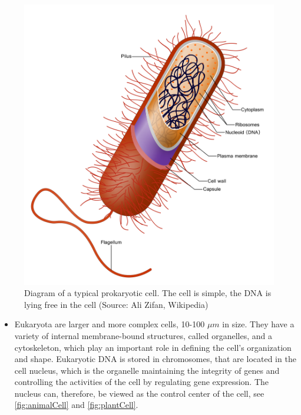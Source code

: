 \documentclass[
  11pt,
]{book}
\providecommand{\tightlist}{%
  \setlength{\itemsep}{0pt}\setlength{\parskip}{0pt}}
\begin{document}
\begin{figure}

{\centering \includegraphics[width=0.5\linewidth]{./figs/prokaryoteCell} 

}

\caption{Diagram of a typical prokaryotic cell. The cell is simple, the DNA is lying free in the cell (Source: Ali Zifan, Wikipedia)}\label{fig:prokaryotaCell}
\end{figure}

\begin{itemize}
\tightlist
\item
  Eukaryota are larger and more complex cells, 10-100 \(\mu m\) in size. They have a variety of internal membrane-bound structures, called organelles, and a cytoskeleton, which play an important role in defining the cell's organization and shape. Eukaryotic DNA is stored in chromosomes, that are located in the cell nucleus, which is the organelle maintaining the integrity of genes and controlling the activities of the cell by regulating gene expression. The nucleus can, therefore, be viewed as the control center of the cell, see \ref{fig:animalCell} and \ref{fig:plantCell}.
\end{itemize}
\end{document}
